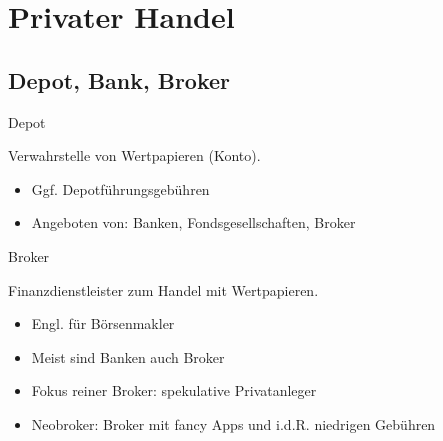 \documentclass{beamer}
\begin{document}
	\section{Privater Handel}
	
		\begin{frame}
		\end{frame}
	
		\subsection{Depot, Bank, Broker}
		
		
			\begin{frame}{Depot}
				\begin{definition}
					Verwahrstelle von Wertpapieren (Konto).
				\end{definition}
				\begin{itemize}
					\item Ggf. Depotführungsgebühren
					\item Angeboten von: Banken, Fondsgesellschaften, Broker
				\end{itemize}
			\end{frame}
		
			\begin{frame}{Broker}
				\begin{definition}
					Finanzdienstleister zum Handel mit Wertpapieren.
				\end{definition}
				\begin{itemize}
					\item Engl. für Börsenmakler
					\item Meist sind Banken auch Broker
					\item Fokus reiner Broker: spekulative Privatanleger
					\item Neobroker: Broker mit fancy Apps und i.d.R. niedrigen Gebühren
				\end{itemize}
			\end{frame}
		
\end{document}
